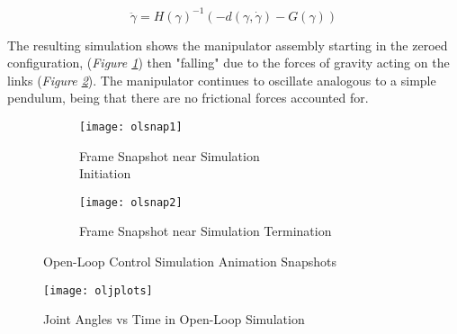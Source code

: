 \begin{equation}
\ddot{\gamma}=H(\gamma)^{-1}(-d(\gamma, \dot{\gamma})-G(\gamma))
\label{eq:eoms2}
\end{equation}

The resulting simulation shows the manipulator assembly starting in the zeroed configuration, (\emph{Figure \ref{fig:olsnap1}}) then "falling" due to the forces of gravity acting on the links (\emph{Figure \ref{fig:olsnap2}}). The manipulator continues to oscillate analogous to a simple pendulum, being that there are no frictional forces accounted for.

\begin{figure}[htp]
  \center
  \begin{subfigure}[c]{0.5\textwidth}
  \center
  \texttt{[image: olsnap1]}
  \caption{Frame Snapshot near Simulation \\Initiation}
  \label{fig:olsnap1}
\end{subfigure}%
\begin{subfigure}[c]{0.5\textwidth}
  \center
  \texttt{[image: olsnap2]}
  \caption{Frame Snapshot near Simulation Termination}
  \label{fig:olsnap2}
\end{subfigure}
  \caption{Open-Loop Control Simulation Animation Snapshots}
  \label{fig:olsnaps}
\end{figure}

\begin{figure}[htp]
  \center
  \texttt{[image: oljplots]}
  \caption{Joint Angles vs Time in Open-Loop Simulation}
  \label{fig:oljplots}
\end{figure}

\newpage
